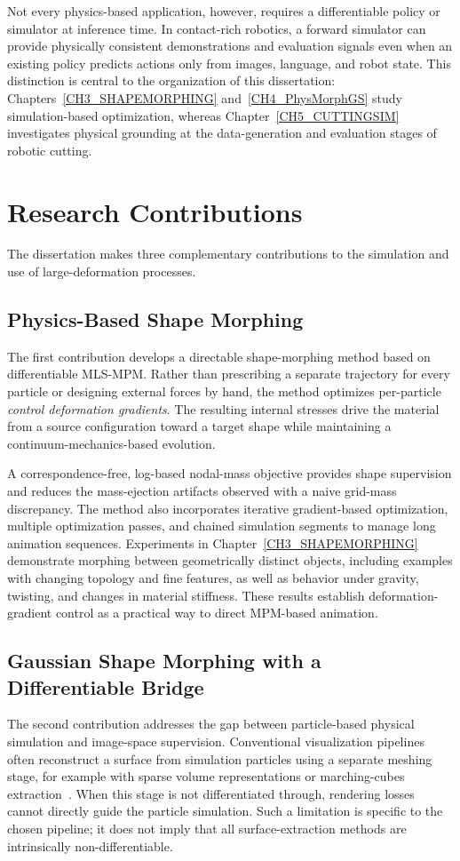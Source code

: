     Not every physics-based application, however, requires a differentiable policy or simulator at inference time. In contact-rich robotics, a forward simulator can provide physically consistent demonstrations and evaluation signals even when an existing policy predicts actions only from images, language, and robot state. This distinction is central to the organization of this dissertation: Chapters~\ref{CH3_SHAPEMORPHING} and~\ref{CH4_PhysMorphGS} study simulation-based optimization, whereas Chapter~\ref{CH5_CUTTINGSIM} investigates physical grounding at the data-generation and evaluation stages of robotic cutting.

\section{Research Contributions}
    The dissertation makes three complementary contributions to the simulation and use of large-deformation processes.

\subsection{Physics-Based Shape Morphing}
\label{sec:contrib_morphing}
    The first contribution develops a directable shape-morphing method based on differentiable MLS-MPM. Rather than prescribing a separate trajectory for every particle or designing external forces by hand, the method optimizes per-particle \emph{control deformation gradients}. The resulting internal stresses drive the material from a source configuration toward a target shape while maintaining a continuum-mechanics-based evolution.
    
    A correspondence-free, log-based nodal-mass objective provides shape supervision and reduces the mass-ejection artifacts observed with a naive grid-mass discrepancy. The method also incorporates iterative gradient-based optimization, multiple optimization passes, and chained simulation segments to manage long animation sequences. Experiments in Chapter~\ref{CH3_SHAPEMORPHING} demonstrate morphing between geometrically distinct objects, including examples with changing topology and fine features, as well as behavior under gravity, twisting, and changes in material stiffness. These results establish deformation-gradient control as a practical way to direct MPM-based animation.

\subsection{Gaussian Shape Morphing with a Differentiable Bridge}
\label{sec:contrib_bridge}
    The second contribution addresses the gap between particle-based physical simulation and image-space supervision. Conventional visualization pipelines often reconstruct a surface from simulation particles using a separate meshing stage, for example with sparse volume representations or marching-cubes extraction~\citep{10.1145/2487228.2487235,lorensen1998marching}. When this stage is not differentiated through, rendering losses cannot directly guide the particle simulation. Such a limitation is specific to the chosen pipeline; it does not imply that all surface-extraction methods are intrinsically non-differentiable.
    
